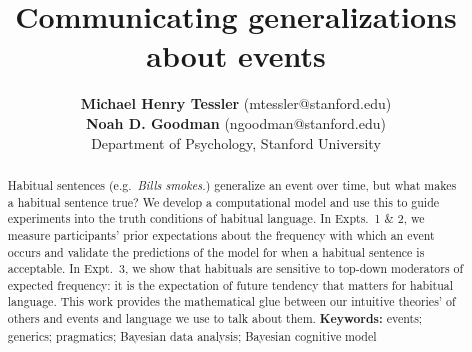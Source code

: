 \documentclass[10pt,letterpaper]{article}
\title{Communicating generalizations about events}
\author{{\large \bf Michael Henry Tessler} (mtessler@stanford.edu) \\
 {\large \bf Noah D. Goodman} (ngoodman@stanford.edu) \\
  Department of Psychology, Stanford University}
\newcommand{\ndg}[1]{\textcolor{Green}{[ndg: #1]}}
\begin{document}
\maketitle


\begin{abstract}
Habitual sentences (e.g.~\emph{Bills smokes.}) generalize an event over time, but what makes a habitual sentence true?
We develop a computational model and use this to guide experiments into the truth conditions of habitual language.
In Expts.~1 \& 2, we measure participants' prior expectations about the frequency with which an event occurs and validate the predictions of the model for when a habitual sentence is acceptable.
In Expt.~3, we show that habituals are sensitive to top-down moderators of expected frequency: it is the expectation of future tendency that matters for habitual language.
This work provides the mathematical glue between our intuitive theories' of others and events and language we use to talk about them.
\textbf{Keywords:} 
events; generics; pragmatics; Bayesian data analysis; Bayesian cognitive model
\end{abstract}
\end{document}
